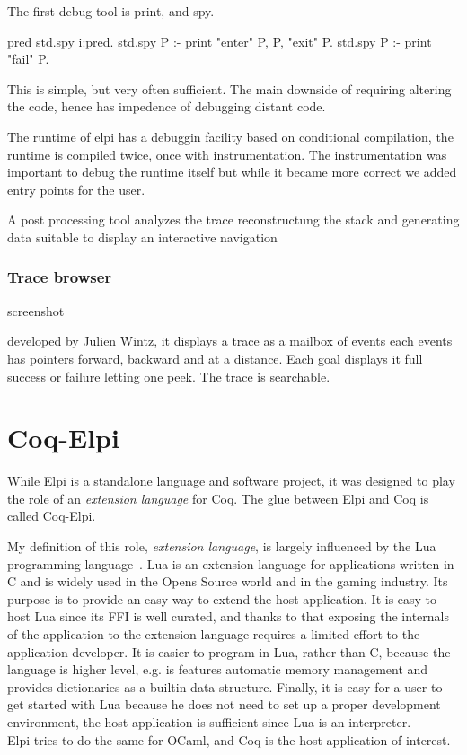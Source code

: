 \documentclass[a4paper, 11pt]{book}
\begin{document}
The first debug tool is print, and spy.

\begin{elpicode}
pred std.spy i:pred.
std.spy P :- print "enter" P, P, "exit" P.
std.spy P :- print "fail" P.
\end{elpicode}

This is simple, but very often sufficient.
The main downside of requiring altering the code, hence has impedence
of debugging distant code.

The runtime of elpi has a debuggin facility based on conditional compilation,
the runtime is compiled twice, once with instrumentation.
The instrumentation was important to debug the runtime itself
but while it became more correct we added entry points for the user.

A post processing tool analyzes the trace reconstructung the
stack and generating data suitable to display an interactive navigation

\subsection{Trace browser}

screenshot

developed by Julien Wintz, it displays a trace as a mailbox of events
each events has pointers forward, backward and at a distance.
Each goal displays it full success or failure letting one
peek. The trace is searchable.

\chapter{Coq-Elpi}

While Elpi is a standalone language and software project, it was designed to
play the role of an \emph{extension language} for Coq. The glue between Elpi and
Coq is called Coq-Elpi.

My definition of this role, \emph{extension language}, is largely influenced
by the Lua programming language~\cite{10.5555/1200583}. Lua is an extension
language for applications written in C and is widely used in the Opens Source
world and in the gaming industry.
Its purpose is to provide an easy way to extend the host application.
It is easy to host Lua since its FFI is well curated, and thanks to that
exposing the internals of the application to the extension language requires a
limited effort to the application developer. It is easier to program in Lua,
rather than C, because the language is higher level, e.g. is features automatic
memory management and provides dictionaries as a builtin data structure.
Finally, it is easy for a user to get started with Lua because he does not need
to set up a proper development environment, the host application is sufficient
since Lua is an interpreter.\\
Elpi tries to do the same for OCaml, and Coq is the host application of interest.
\end{document}
